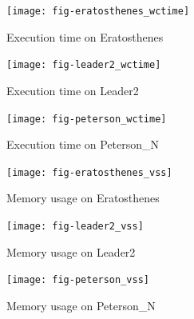 \documentclass{acm_proc_article-sp}
\begin{document}
\begin{figure}[p]
\centering
\texttt{[image: fig-eratosthenes\_wctime]}
\caption{Execution time on Eratosthenes}
\label{fig-eratosthenes_wctime}
\end{figure}

\begin{figure}[p]
\centering
\texttt{[image: fig-leader2\_wctime]}
\caption{Execution time on Leader2}
\label{fig-leader2_wctime}
\end{figure}

\begin{figure}[p]
\centering
\texttt{[image: fig-peterson\_wctime]}
\caption{Execution time on Peterson\_N}
\label{fig-peterson_wctime}
\end{figure}

\begin{figure}[p]
\centering
\texttt{[image: fig-eratosthenes\_vss]}
\caption{Memory usage on Eratosthenes}
\label{fig-eratosthenes_vss}
\end{figure}

\begin{figure}[p]
\centering
\texttt{[image: fig-leader2\_vss]}
\caption{Memory usage on Leader2}
\label{fig-leader2_vss}
\end{figure}

\begin{figure}[p]
\centering
\texttt{[image: fig-peterson\_vss]}
\caption{Memory usage on Peterson\_N}
\label{fig-peterson_vss}
\end{figure}

%
%
\end{document}
